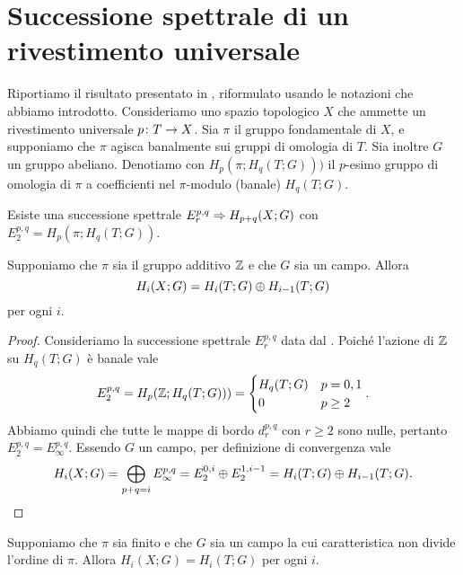 \section{Successione spettrale di un rivestimento universale}
Riportiamo il risultato presentato in , riformulato usando le notazioni che abbiamo introdotto. Consideriamo uno spazio topologico \(X\) che ammette un rivestimento universale \(\map{p}{T}{X}\). Sia \(\pi\) il gruppo fondamentale di \(X\), e supponiamo che \(\pi\) agisca banalmente sui gruppi di omologia di \(T\). Sia inoltre \(G\) un gruppo abeliano. Denotiamo con \(H_p(\pi;H_q(T;G)))\) il \(p\)-esimo gruppo di omologia di \(\pi\) a coefficienti nel \(\pi\)-modulo (banale) \(H_q(T;G)\).
\begin{theorem}
Esiste una successione spettrale \(E^{p,q}_r\Rightarrow H_{p+q}(X;G)\) con \(E^{p,q}_2=H_p(\pi;H_q(T;G))\).
\end{theorem}
\begin{corollary}
Supponiamo che \(\pi\) sia il gruppo additivo \(\mathbb{Z}\) e che \(G\) sia un campo. Allora
\[
H_i(X;G)=H_i(T;G)\mathbin{\oplus} H_{i-1}(T;G)
\]
per ogni \(i\).
\end{corollary}
\begin{proof}
Consideriamo la successione spettrale \(E^{p,q}_r\) data dal . Poiché l'azione di \(\mathbb{Z}\) su \(H_q(T;G)\) è banale vale
\[
E^{p,q}_2=H_p(\mathbb{Z};H_q(T;G)))=
\begin{cases}
H_q(T;G)&p=0,1\\
0&p\ge 2
\end{cases}.
\]
Abbiamo quindi che tutte le mappe di bordo \(d^{p,q}_r\) con \(r\ge 2\) sono nulle, pertanto \(E^{p,q}_2=E^{p,q}_\infty\). Essendo \(G\) un campo, per definizione di convergenza vale
\[
H_i(X;G)=\bigoplus_{p+q=i}E^{p,q}_\infty=E^{0,i}_2\mathbin{\oplus} E^{1,i-1}_2=H_i(T;G)\mathbin{\oplus} H_{i-1}(T;G).\qedhere
\]
\end{proof}
\begin{corollary}
Supponiamo che \(\pi\) sia finito e che \(G\) sia un campo la cui caratteristica non divide l'ordine di \(\pi\). Allora \(H_i(X;G)=H_i(T;G)\) per ogni \(i\).
\end{corollary}
